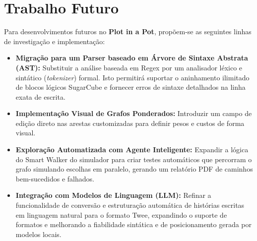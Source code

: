 \section{Trabalho Futuro}
Para desenvolvimentos futuros no \textbf{Plot in a Pot}, propõem-se as seguintes linhas de investigação e implementação:
\begin{itemize}
    \item \textbf{Migração para um Parser baseado em Árvore de Sintaxe Abstrata (AST):} Substituir a análise baseada em Regex por um analisador léxico e sintático (\textit{tokenizer}) formal. Isto permitirá suportar o aninhamento ilimitado de blocos lógicos SugarCube e fornecer erros de sintaxe detalhados na linha exata de escrita.
    \item \textbf{Implementação Visual de Grafos Ponderados:} Introduzir um campo de edição direto nas arestas customizadas para definir pesos e custos de forma visual.
    \item \textbf{Exploração Automatizada com Agente Inteligente:} Expandir a lógica do Smart Walker do simulador para criar testes automáticos que percorram o grafo simulando escolhas em paralelo, gerando um relatório PDF de caminhos bem-sucedidos e falhados.
    \item \textbf{Integração com Modelos de Linguagem (LLM):} Refinar a funcionalidade de conversão e estruturação automática de histórias escritas em linguagem natural para o formato Twee, expandindo o suporte de formatos e melhorando a fiabilidade sintática e de posicionamento gerada por modelos locais.
\end{itemize}
